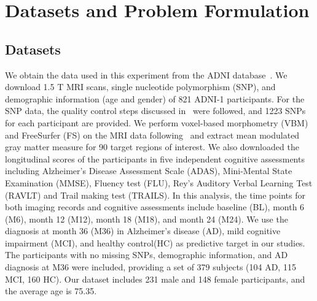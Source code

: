 \section{Datasets and Problem Formulation}
\subsection{Datasets}
We obtain the data used in this experiment from the ADNI database~\cite{risacher2010longitudinal}. We download 1.5 T MRI scans, single nucleotide polymorphism (SNP), and demographic information (age and gender) of 821 ADNI-1 participants. For the SNP data, the quality control steps discussed in~\cite{shen2010whole} were followed, and 1223 SNPs for each participant are provided. We perform voxel-based morphometry (VBM) and FreeSurfer (FS) on the MRI data following~\cite{risacher2010longitudinal} and extract mean modulated gray matter measure for 90 target regions of interest. We also downloaded the longitudinal scores of the participants in five independent cognitive assessments including Alzheimer’s Disease Assessment Scale (ADAS), Mini-Mental State Examination (MMSE), Fluency test (FLU), Rey’s Auditory Verbal Learning Test (RAVLT) and Trail making test (TRAILS). 
In this analysis, the time points for both imaging records and cognitive assessments include baseline (BL), month 6 (M6), month 12 (M12), month 18 (M18), and month 24 (M24). We use the diagnosis at month 36 (M36) in Alzheimer's disease (AD), mild cognitive impairment (MCI), and healthy control(HC) as predictive target in our studies. The participants with no missing SNPs, demographic information, and AD diagnosis at M36 were included, providing a set of 379 subjects (104 AD, 115 MCI, 160 HC). Our dataset includes 231 male and 148 female participants, and the average age is 75.35.

